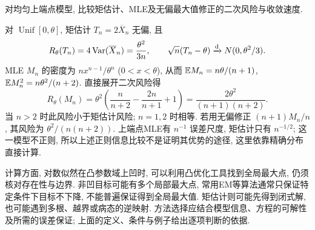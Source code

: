 \begin{example}
对均匀上端点模型, 比较矩估计、MLE及无偏最大值修正的二次风险与收敛速度.
\end{example}
\begin{solution}
对 $\operatorname{Unif}[0,\theta]$, 矩估计 $T_n=2\overline X_n$ 无偏, 且
\[
 R_\theta(T_n)=4\operatorname{Var}(\overline X_n)=\frac{\theta^2}{3n},\qquad
 \sqrt n(T_n-\theta)\xrightarrow{\mathrm d} N(0,\theta^2/3).
\]
MLE $M_n$ 的密度为 $nx^{n-1}/\theta^n$ ($0<x<\theta$), 从而
$\mathbb E M_n=n\theta/(n+1)$, $\mathbb E M_n^2=n\theta^2/(n+2)$. 直接展开二次风险得
\[
 R_\theta(M_n)=\theta^2\left(\frac n{n+2}-\frac{2n}{n+1}+1\right)
 =\frac{2\theta^2}{(n+1)(n+2)}.
\]
当 $n>2$ 时此风险小于矩估计风险; $n=1,2$ 时相等. 若用无偏修正 $(n+1)M_n/n$, 其风险为 $\theta^2/(n(n+2))$. 上端点MLE有 $n^{-1}$ 误差尺度, 矩估计只有 $n^{-1/2}$; 这一模型不正则, 所以上述正则信息比较不是证明其优势的途径, 这里依靠精确分布直接计算.
\end{solution}

计算方面, 对数似然在凸参数域上凹时, 可以利用凸优化工具找到全局最大点, 仍须核对存在性与边界. 非凹目标可能有多个局部最大点, 常用EM等算法通常只保证特定条件下目标不下降, 不能普遍保证得到全局最大值. 矩估计则可能先得到闭式解, 也可能遇到多根、越界或病态的逆映射. 方法选择应结合模型信息、方程的可解性及所需的误差保证; 上面的定义、条件与例子给出逐项判断的依据.
